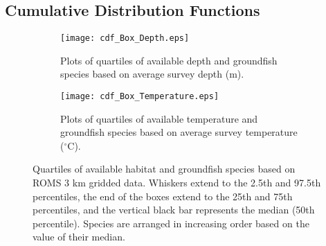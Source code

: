 \documentclass[11pt]{book}\usepackage[]{graphicx}\usepackage[]{color}
\begin{document}
\newpage

\newpage
\clearpage

\subsection{Cumulative Distribution Functions}

\graphicspath{ {c:/GitHub/SPERA-Maps/Results/Figures/} }
\begin{figure*}
    \centering
    \begin{subfigure}[b]{0.475\textwidth}
    \centering
    \texttt{[image: cdf\_Box\_Depth.eps]}
    \caption[]
      {{\small Plots of quartiles of available depth and groundfish species based on average survey depth (m).}}    
    \label{fig:cdf.box.depth}
        \end{subfigure}
    \hfill
    \begin{subfigure}[b]{0.475\textwidth}  
    \centering 
    \texttt{[image: cdf\_Box\_Temperature.eps]}
    \caption[]%
     {{\small Plots of quartiles of available temperature and groundfish species based on average survey temperature ($^\circ$C).}}    
    \label{fig:cdf.box.temp}
    \end{subfigure}
    \caption[ ]
     {\small Quartiles of available habitat and groundfish species based on ROMS 3 km gridded data. Whiskers extend to the 2.5th and 97.5th percentiles, the end of the boxes extend to the 25th and 75th percentiles, and the vertical black bar represents the median (50th percentile). Species are arranged in increasing order based on the value of their median.} 
    \label{fig:cdf.box.survey}
    \end{figure*}
 
\end{document}
